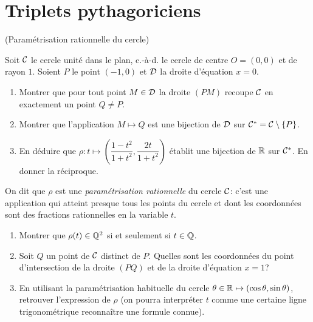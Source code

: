 \documentclass[a4paper,11pt,reqno]{amsart}
\begin{document}
\section{Triplets pythagoriciens}

\begin{exo}\label{cerclerat} (Paramétrisation rationnelle du cercle)

  Soit $\mathcal{C}$ le cercle unité dans le plan, c.-à-d. le cercle de centre $O=(0,0)$ et de rayon $1$. Soient $P$ le point $(-1,0)$ et $\mathcal{D}$ la droite d'équation $x=0$.
  \begin{enumerate}
    \item Montrer que pour tout point $M \in \mathcal{D}$ la droite $(PM)$ recoupe $\mathcal{C}$ en exactement un point $Q \neq P$.
    \item Montrer que l'application $M \mapsto Q$ est une bijection de $\mathcal{D}$ sur $\mathcal{C}^\ast=\mathcal{C} \setminus \{P\}$.
    \item En déduire que $\rho \colon t \longmapsto \left( \dfrac{1-t^2}{1+t^2}, \dfrac{2t}{1+t^2}\right)$ établit une bijection de $\mathbb{R}$ sur $\mathcal{C}^\ast$. En donner la réciproque.
  \end{enumerate}
  \begin{convention}
      On dit que $\rho$ est une \emph{paramétrisation rationnelle} du cercle $\mathcal{C}$: c'est une application qui atteint presque tous les points du cercle et dont les coordonnées sont des fractions rationnelles en la variable $t$.
  \end{convention}
  \begin{enumerate}[resume]
    \item Montrer que $\rho(t) \in \mathbb{Q}^2$ si et seulement si $t \in \mathbb{Q}$.
    \item Soit $Q$ un point de $\mathcal{C}$ distinct de $P$. Quelles sont les coordonnées du point d'intersection de la droite $(PQ)$ et de la droite d'équation $x=1$?
    \item En utilisant la paramétrisation habituelle du cercle $\theta \in \mathbb{R} \mapsto (\cos \theta,\sin \theta)$, retrouver l'expression de $\rho$ (on pourra interpréter $t$ comme une certaine ligne trigonométrique reconnaître une formule connue).
  \end{enumerate}
\end{exo}
\end{document}
